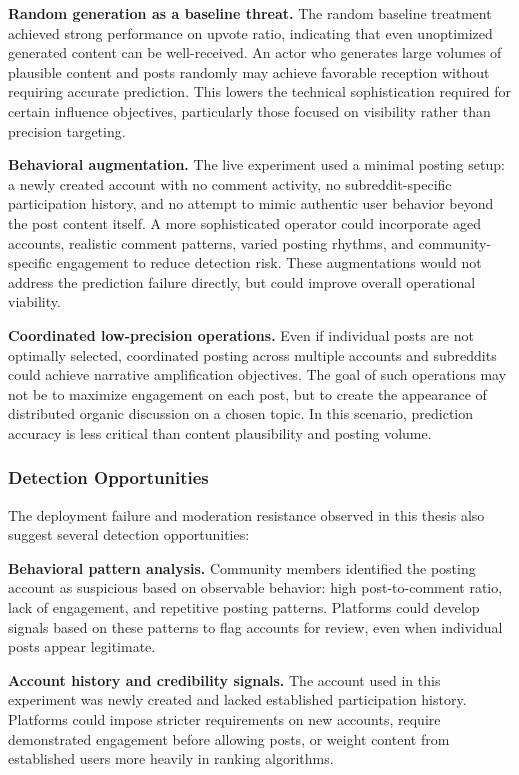 \textbf{Random generation as a baseline threat.} The random baseline treatment achieved strong performance on upvote ratio, indicating that even unoptimized generated content can be well-received. An actor who generates large volumes of plausible content and posts randomly may achieve favorable reception without requiring accurate prediction. This lowers the technical sophistication required for certain influence objectives, particularly those focused on visibility rather than precision targeting.

\textbf{Behavioral augmentation.} The live experiment used a minimal posting setup: a newly created account with no comment activity, no subreddit-specific participation history, and no attempt to mimic authentic user behavior beyond the post content itself. A more sophisticated operator could incorporate aged accounts, realistic comment patterns, varied posting rhythms, and community-specific engagement to reduce detection risk. These augmentations would not address the prediction failure directly, but could improve overall operational viability.

\textbf{Coordinated low-precision operations.} Even if individual posts are not optimally selected, coordinated posting across multiple accounts and subreddits could achieve narrative amplification objectives. The goal of such operations may not be to maximize engagement on each post, but to create the appearance of distributed organic discussion on a chosen topic. In this scenario, prediction accuracy is less critical than content plausibility and posting volume.

\subsubsection*{Detection Opportunities}

The deployment failure and moderation resistance observed in this thesis also suggest several detection opportunities:

\textbf{Behavioral pattern analysis.} Community members identified the posting account as suspicious based on observable behavior: high post-to-comment ratio, lack of engagement, and repetitive posting patterns. Platforms could develop signals based on these patterns to flag accounts for review, even when individual posts appear legitimate.

\textbf{Account history and credibility signals.} The account used in this experiment was newly created and lacked established participation history. Platforms could impose stricter requirements on new accounts, require demonstrated engagement before allowing posts, or weight content from established users more heavily in ranking algorithms.

